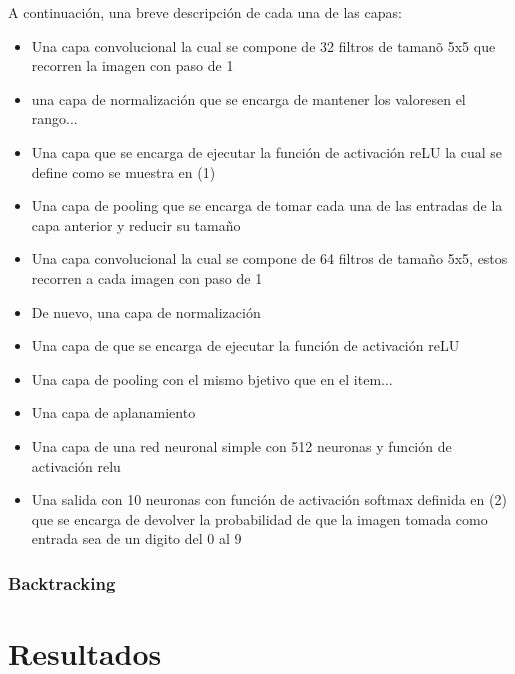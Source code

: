 \documentclass{article}
\begin{document}
\begin{figure}[H]
\end{figure}
A continuaci\'on, una breve descripci\'on de cada una de las capas:
\begin{itemize}
  \item Una capa convolucional la cual se compone de 32 filtros de taman\~o 5x5 que recorren la imagen con paso de 1
  \item una capa de normalizaci\'on que se encarga de mantener los valoresen el rango...
  \item Una capa que se encarga de ejecutar la funci\'on de activaci\'on reLU la cual se define como se muestra en (1)
  \item Una capa de pooling que se encarga de tomar cada una de las entradas de la capa anterior y reducir su tama\~no
  \item Una capa convolucional la cual se compone de 64 filtros de tama\~no 5x5, estos recorren a cada imagen con paso de 1
  \item De nuevo, una capa de normalizaci\'on
  \item Una capa de que se encarga de ejecutar la funci\'on de activaci\'on reLU
  \item Una capa de pooling con el mismo bjetivo que en el item...
  \item Una capa de aplanamiento
  \item Una capa de una red neuronal simple con 512 neuronas y funci\'on de activaci\'on relu
  \item Una salida con 10 neuronas con funci\'on de activaci\'on softmax definida en (2) que se encarga de devolver la probabilidad de que la imagen tomada como entrada sea de un digito del 0 al 9
\end{itemize}
\subsubsection{Backtracking}
\section{Resultados}


    
\end{document}

